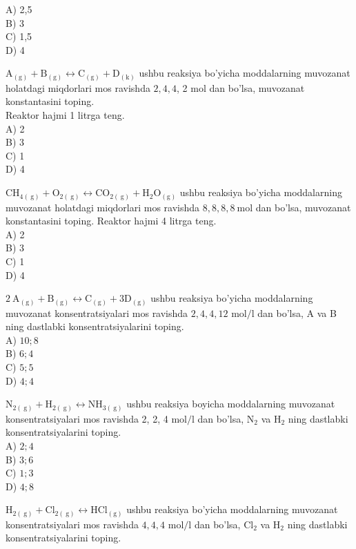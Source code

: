 A) 2,5\\
B) 3\\
C) 1,5\\
D) 4
  \item $\mathrm{A}_{(\mathrm{g})}+\mathrm{B}_{(\mathrm{g})} \leftrightarrow \mathrm{C}_{(\mathrm{g})}+\mathrm{D}_{(\mathrm{k})}$ ushbu reaksiya bo'yicha moddalarning muvozanat holatdagi miqdorlari mos ravishda $2,4,4$, 2 mol dan bo'lsa, muvozanat konstantasini toping.\\
Reaktor hajmi 1 litrga teng.\\
A) 2\\
B) 3\\
C) 1\\
D) 4
  \item $\mathrm{CH}_{4(\mathrm{~g})}+\mathrm{O}_{2(\mathrm{~g})} \leftrightarrow \mathrm{CO}_{2(\mathrm{~g})}+\mathrm{H}_{2} \mathrm{O}_{(\mathrm{g})}$ ushbu reaksiya bo'yicha moddalarning muvozanat holatdagi miqdorlari mos ravishda $8,8,8,8 \mathrm{~mol}$ dan bo'lsa, muvozanat konstantasini toping. Reaktor hajmi 4 litrga teng.\\
A) 2\\
B) 3\\
C) 1\\
D) 4
  \item $2 \mathrm{~A}_{(\mathrm{g})}+\mathrm{B}_{(\mathrm{g})} \leftrightarrow \mathrm{C}_{(\mathrm{g})}+3 \mathrm{D}_{(\mathrm{g})}$ ushbu reaksiya bo'yicha moddalarning muvozanat konsentratsiyalari mos ravishda $2,4,4,12$ $\mathrm{mol} / \mathrm{l}$ dan bo'lsa, A va B ning dastlabki konsentratsiyalarini toping.\\
A) $10 ; 8$\\
B) $6 ; 4$\\
C) $5 ; 5$\\
D) $4 ; 4$
  \item $\mathrm{N}_{2(\mathrm{~g})}+\mathrm{H}_{2(\mathrm{~g})} \leftrightarrow \mathrm{NH}_{3(\mathrm{~g})}$ ushbu reaksiya boyicha moddalarning muvozanat konsentratsiyalari mos ravishda 2, 2, 4 $\mathrm{mol} / \mathrm{l}$ dan bo'lsa, $\mathrm{N}_{2}$ va $\mathrm{H}_{2}$ ning dastlabki konsentratsiyalarini toping.\\
A) $2 ; 4$\\
B) $3 ; 6$\\
C) $1 ; 3$\\
D) $4 ; 8$
  \item $\mathrm{H}_{2(\mathrm{~g})}+\mathrm{Cl}_{2(\mathrm{~g})} \leftrightarrow \mathrm{HCl}_{(\mathrm{g})}$ ushbu reaksiya bo'yicha moddalarning muvozanat konsentratsiyalari mos ravishda $4,4,4$ $\mathrm{mol} / \mathrm{l}$ dan bo'lsa, $\mathrm{Cl}_{2}$ va $\mathrm{H}_{2}$ ning dastlabki konsentratsiyalarini toping.\\
